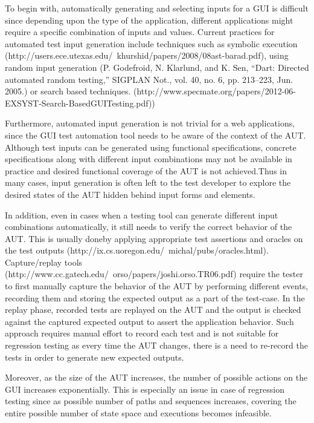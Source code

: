To begin with, automatically generating and selecting inputs for a GUI is difficult since depending upon the type of the application, different applications might require a specific combination of inputs and values. 
Current practices for automated test input generation include techniques such as symbolic execution (http://users.ece.utexas.edu/~khurshid/papers/2008/08ast-barad.pdf), using random input generation (P. Godefroid, N. Klarlund, and K. Sen, “Dart: Directed automated random testing,” SIGPLAN Not., vol. 40, no. 6, pp. 213–223, Jun. 2005.) or search based techniques. (http://www.specmate.org/papers/2012-06-EXSYST-Search-BasedGUITesting.pdf))

Furthermore, automated input generation is not trivial for a web applications, since the GUI test automation tool needs to be aware of the context of the AUT. Although test inputs can be generated using functional specifications, concrete specifications along with different input combinations may not be available in practice and desired functional coverage of the AUT is not achieved.Thus in many cases, input generation is often left to the test developer to explore the desired states of the AUT hidden behind input forms and elements.

In addition, even in cases when a testing tool can generate different input combinations automatically, it still needs to verify the correct behavior of the AUT. This is usually doneby applying appropriate test assertions and oracles on the test outputs (http://ix.cs.uoregon.edu/~michal/pubs/oracles.html). Capture/replay tools (http://www.cc.gatech.edu/~orso/papers/joshi.orso.TR06.pdf) require the tester to first manually capture the behavior of the AUT by performing different events, recording them and storing the expected output as a part of the test-case. In the replay phase, recorded tests are replayed on the AUT and the output is checked against the captured expected output to assert the application behavior. Such approach requires manual effort to record each test and is not suitable for regression testing as every time the AUT changes, there is a need to re-record the tests in order to generate new expected outputs. 

Moreover, as the size of the AUT increases, the number of possible actions on the GUI increases exponentially. This is especially an issue in case of regression testing since as possible number of paths and sequences increases, covering the entire possible number of state space and executions becomes infeasible. 

